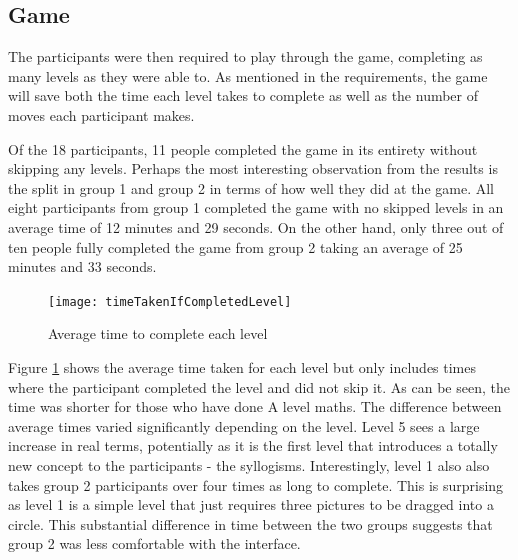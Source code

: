 \documentclass[12pt,a4paper]{report}
\begin{document}
\subsection{Game}

The participants were then required to play through the game, completing as many levels as they were able to. As mentioned in the requirements, the game will save both the time each level takes to complete as well as the number of moves each participant makes. 

Of the 18 participants, 11 people completed the game in its entirety without skipping any levels. Perhaps the most interesting observation from the results is the split in group 1 and group 2 in terms of how well they did at the game. All eight participants from group 1 completed the game with no skipped levels in an average time of 12 minutes and 29 seconds. On the other hand, only three out of ten people fully completed the game from group 2 taking an average of 25 minutes and 33 seconds.


\begin{figure}[h]
\centering
    \texttt{[image: timeTakenIfCompletedLevel]}
    \caption{Average time to complete each level}
        \label{fig:timeTakenIfCompletedLevel}
\end{figure}
\FloatBarrier

Figure \ref{fig:timeTakenIfCompletedLevel} shows the average time taken for each level but only includes times where the participant completed the level and did not skip it. As can be seen, the time was shorter for those who have done A level maths. The difference between average times varied significantly depending on the level. Level 5 sees a large increase in real terms, potentially as it is the first level that introduces a totally new concept to the participants - the syllogisms. Interestingly, level 1 also also takes group 2 participants over four times as long to complete. This is surprising as level 1 is a simple level that just requires three pictures to be dragged into a circle. This substantial difference in time between the two groups suggests that group 2 was less comfortable with the interface.
\end{document}
